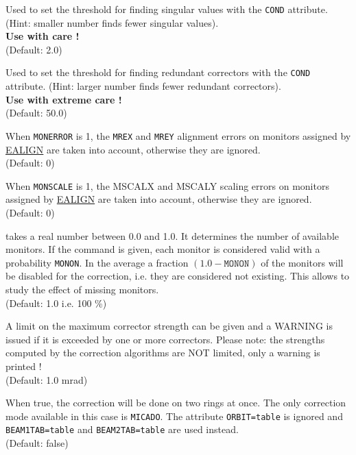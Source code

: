 \begin{madlist}
     Used to set the threshold for finding singular values
     with the \texttt{COND} attribute. (Hint: smaller number finds fewer singular
     values).  
     \\ \textbf{Use with care !}
     \\ (Default: 2.0)

     Used to set the threshold for finding redundant
     correctors with the \texttt{COND} attribute. (Hint: larger number finds fewer
     redundant correctors).  
     \\ \textbf{Use with extreme care !}
     \\ (Default: 50.0) 

    When \texttt{MONERROR} is 1, the \texttt{MREX} and \texttt{MREY} 
     alignment errors on monitors assigned  by \hyperref[sec:ealign]{EALIGN} 
     are taken into account, otherwise they are ignored.
     \\ (Default: 0)

    When \texttt{MONSCALE} is 1, the MSCALX and
     MSCALY scaling errors on monitors assigned  by \hyperref[sec:ealign]{EALIGN}  
     are taken into account, otherwise they are ignored.
     \\ (Default: 0)

    takes a real number between 0.0 and 1.0. It
     determines the number of available monitors. If the command is
     given, each monitor is considered valid with a probability
     \texttt{MONON}. In the average a fraction $(1.0 - \texttt{MONON})$ 
     of the monitors will be disabled for the correction, i.e. they are 
     considered not existing.  This allows to study the effect of missing monitors.
     \\ (Default: 1.0 i.e. 100 \%) 

     A limit on the maximum corrector strength can be
     given and a WARNING is issued if it is exceeded by one or more
     correctors.  Please note: the strengths computed by the correction
     algorithms are NOT limited, only a warning is printed ! 
     \\ (Default: 1.0 mrad)

    When true, the correction will be done on two rings at
     once. The only correction mode available in this case is
     \texttt{MICADO}. The attribute \texttt{ORBIT=table} is ignored and \texttt{BEAM1TAB=table} and
     \texttt{BEAM2TAB=table} are used instead.  
     \\ (Default: false)


\end{madlist}
